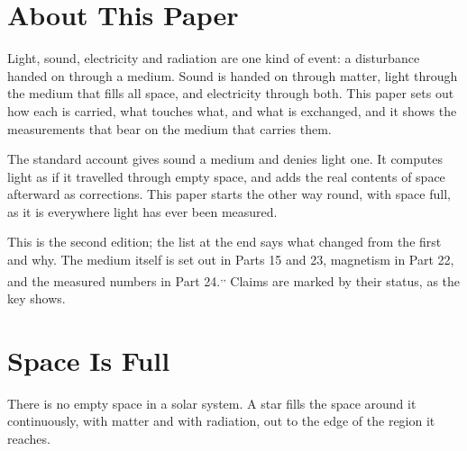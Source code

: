 \newcommand{\gptpart}{28}
\newcommand{\gpttitle}{Resonance Transmissions}
\newcommand{\gptsubtitle}{Light, Sound and Electricity in the Medium}
\newcommand{\gptdate}{November 2026}

\graphicspath{{figs/}}

\gptitle

\section*{About This Paper}

Light, sound, electricity and radiation are one kind of event: a disturbance handed on through a medium. Sound is handed on through matter, light through the medium that fills all space, and electricity through both. This paper sets out how each is carried, what touches what, and what is exchanged, and it shows the measurements that bear on the medium that carries them.

The standard account gives sound a medium and denies light one. It computes light as if it travelled through empty space, and adds the real contents of space afterward as corrections. This paper starts the other way round, with space full, as it is everywhere light has ever been measured.

This is the second edition; the list at the end says what changed from the first and why. The medium itself is set out in Parts 15 and 23, magnetism in Part 22, and the measured numbers in Part 24.\textsuperscript{,}\textsuperscript{,} Claims are marked by their status, as the key shows.

\statuskey

\section{Space Is Full}

There is no empty space in a solar system. A star fills the space around it continuously, with matter and with radiation, out to the edge of the region it reaches.

